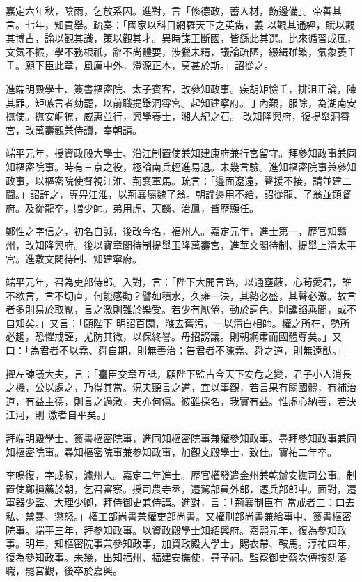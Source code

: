 \begin{pinyinscope}
 嘉定六年秋，陰雨，乞放系囚。進對，言「修德政，蓄人材，飭邊備」。帝善其言。七年，知貢舉。疏奏：「國家以科目網羅天下之英雋，義
 以觀其通經，賦以觀其博古，論以觀其識，策以觀其才。異時謀王斷國，皆繇此其選。比來循習成風，文氣不振，學不務根祇，辭不尚體要，涉獵未精，議論疏陋，綴緝雖繁，氣象萎ＴＴ。願下臣此章，風厲中外，澄源正本，莫甚於斯。」詔從之。



 進端明殿學士、簽書樞密院、太子賓客，改參知政事。疾胡矩憸壬，排沮正論，陳其罪。矩嗾言者劾罷，以前職提舉洞霄宮。起知建寧府。丁內艱，服除，為湖南安撫使。撫安峒獠，威惠並行，興學養士，湘人紀之石。
 改知隆興府，復提舉洞霄宮，改萬壽觀兼侍讀，奉朝請。



 端平元年，授資政殿大學士、沿江制置使兼知建康府兼行宮留守。拜參知政事兼同知樞密院事。時有三京之役，極論南兵輕進易退。未幾言驗。進知樞密院事兼參知政事，以樞密院使督視江淮、荊襄軍馬。疏言：「邊面遼遠，聲援不接，請並建二閫。」詔許之，專畀江淮，以荊襄屬魏了翁。朝論邊用不給，詔從龍、了翁並領督府。及從龍卒，贈少師。弟用虎、天麟、治鳳，皆歷顯任。



 鄭性之字信之，初名自誠，後改今名，福州人。嘉定元年，進士第一，歷官知贛州，改知隆興府。後以寶章閣待制提舉玉隆萬壽宮，進華文閣待制、提舉上清太平宮。進敷文閣待制、知建寧府。



 端平元年，召為吏部侍郎。入對，言：「陛下大開言路，以通壅蔽，心茍愛君，誰不欲言，言不切直，何能感動？譬如積水，久雍一決，其勢必盛，其聲必激。故言者多則易於取厭，言之激則難於樂受。若少有厭倦，動於詞色，則讒諂乘間，或不自知矣。」又言：「願陛下
 明詔百闢，滌去舊污，一以清白相師。權之所在，勢所必趨，恐懼戒謹，尤防其微，以保終譽。毋招謗議。則朝綱肅而國體尊矣。」又曰：「為君者不以堯、舜自期，則無善治；告君者不陳堯、舜之道，則無遠猷。」



 擢左諫議大夫，言：「臺臣交章互詆，願陛下監古今天下安危之變，君子小人消長之機，公以處之，乃得其當。況夫聽言之道，宜以事觀，若言果有關國體，有補治道，有益主德，則言之過激，夫亦何傷。彼雖採名，我實有益。惟虛心納善，若決江河，則
 激者自平矣。」



 拜端明殿學士、簽書樞密院事，進同知樞密院事兼權參知政事。尋拜參知政事兼同知樞密院事。尋知樞密院事兼參知政事，加觀文殿學士，致仕。寶祐二年卒。



 李鳴復，字成叔，瀘州人。嘉定二年進士。歷官權發遣金州兼乾辦安撫司公事。制置使鄭損薦於朝，乞召審察。授司農寺丞，遷駕部員外郎，遷兵部郎中。面對，遷軍器少監、大理少卿，拜侍御史兼侍講。進對，言：「荊襄制臣有
 當戒者三：曰去私、禁暴、懲怒。」權工部尚書兼權吏部尚書。又權刑部尚書兼給事中、簽書樞密院事。端平三年，拜參知政事。以資政殿學士知紹興府。嘉熙元年，復為參知政事。明年，知樞密院事兼參知政事，加資政殿大學士，賜衣帶、鞍馬。淳祐四年，復為參知政事。未幾，出知福州、福建安撫使，尋予祠。監察御史蔡次傳按劾落職，罷宮觀，後卒於嘉興。




\end{pinyinscope}
